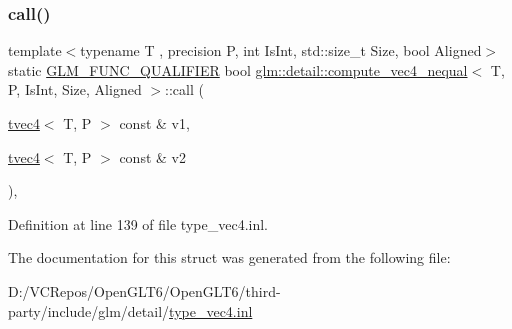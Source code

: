 \subsubsection{\texorpdfstring{call()}{call()}}
{\footnotesize\ttfamily template$<$typename T , precision P, int Is\+Int, std\+::size\+\_\+t Size, bool Aligned$>$ \\
static \mbox{\hyperlink{setup_8hpp_a33fdea6f91c5f834105f7415e2a64407}{G\+L\+M\+\_\+\+F\+U\+N\+C\+\_\+\+Q\+U\+A\+L\+I\+F\+I\+ER}} bool \mbox{\hyperlink{structglm_1_1detail_1_1compute__vec4__nequal}{glm\+::detail\+::compute\+\_\+vec4\+\_\+nequal}}$<$ T, P, Is\+Int, Size, Aligned $>$\+::call (\begin{DoxyParamCaption}\item[{\mbox{\hyperlink{structglm_1_1tvec4}{tvec4}}$<$ T, P $>$ const \&}]{v1,  }\item[{\mbox{\hyperlink{structglm_1_1tvec4}{tvec4}}$<$ T, P $>$ const \&}]{v2 }\end{DoxyParamCaption})\hspace{0.3cm}{\ttfamily [inline]}, {\ttfamily [static]}}



Definition at line 139 of file type\+\_\+vec4.\+inl.



The documentation for this struct was generated from the following file\+:\begin{DoxyCompactItemize}
\item 
D\+:/\+V\+C\+Repos/\+Open\+G\+L\+T6/\+Open\+G\+L\+T6/third-\/party/include/glm/detail/\mbox{\hyperlink{type__vec4_8inl}{type\+\_\+vec4.\+inl}}\end{DoxyCompactItemize}
